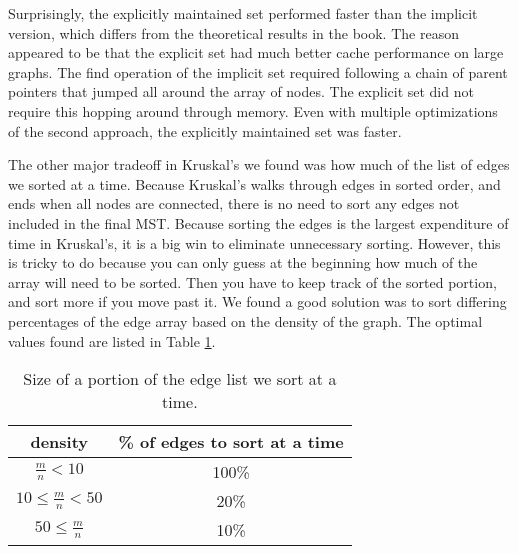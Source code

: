 Surprisingly, the explicitly maintained set performed faster than the
implicit version, which differs from the theoretical results in the
book. The reason appeared to
be that the explicit set had much better cache performance on large
graphs. The find operation of the
implicit set required following a chain of parent pointers that jumped
all around the array of nodes. The explicit set did not require this
hopping around through memory. Even with multiple optimizations of the
second approach, the explicitly maintained set was faster.

The other major tradeoff in Kruskal's we found was how much of the list of
edges we sorted at a time. Because Kruskal's walks through edges in sorted
order, and ends when all nodes are connected, there is no need to sort any
edges not included in the final MST. Because sorting the edges is the
largest expenditure of time in Kruskal's, it is a big win to eliminate
unnecessary sorting. However, this is tricky to do because you can only
guess at the beginning how much of the array will need to be sorted. Then
you have to keep track of the sorted portion, and sort more if you move
past it. We found a good solution was to sort differing percentages of the
edge array based on the density of the graph. The optimal values found are
listed in Table \ref{table:kruskal-sort-percent}.

\begin{table}
\begin{tabular}{|c|c|}
\hline
density&\% of edges to sort at a time\\
\hline
$\frac{m}{n} < 10$& 100\% \\
$10 \leq \frac{m}{n} < 50$& 20\% \\
$50 \leq \frac{m}{n}$& 10\% \\
\hline
\end{tabular}
\caption{Size of a portion of the edge list we sort at a time.}
\label{table:kruskal-sort-percent}
\end{table}
